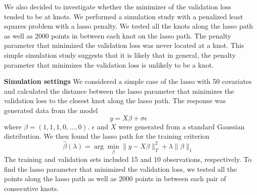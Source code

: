 \documentclass[]{article}
\begin{document}
\begin{enumerate}
		We also decided to investigate whether the minimizer of the validation loss tended to be at knots. We performed a simulation study with a penalized least squares problem with a lasso penalty. We tested all the knots along the lasso path as well as 2000 points in between each knot on the lasso path. The penalty parameter that minimized the validation loss was never located at a knot. This simple simulation study suggests that it is likely that in general, the penalty parameter that minimizes the validation loss is unlikely to be a knot. 
		
		\textbf{Simulation settings} We considered a simple case of the lasso with 50 covariates and calculated the distance between the lasso parameter that minimizes the validation loss to the closest knot along the lasso path. The response was generated data from the model
		$$
		y = X\beta + \sigma\epsilon
		$$
		where $\beta = (1, 1, 1, 0, ..., 0)$. $\epsilon$ and $X$ were generated from a standard Gaussian distribution. We then found the lasso path for the training criterion
		$$
		\hat{\beta}(\lambda) = \arg\min_{\beta} \| y - X\beta \|_T^2 + \lambda \|\beta\|_1
		$$
		The training and validation sets included 15 and 10 observations, respectively. To find the lasso parameter that minimized the validation loss, we tested all the points along the lasso path as well as 2000 points in between each pair of consecutive knots.
		
	\end{enumerate}
\end{document}
